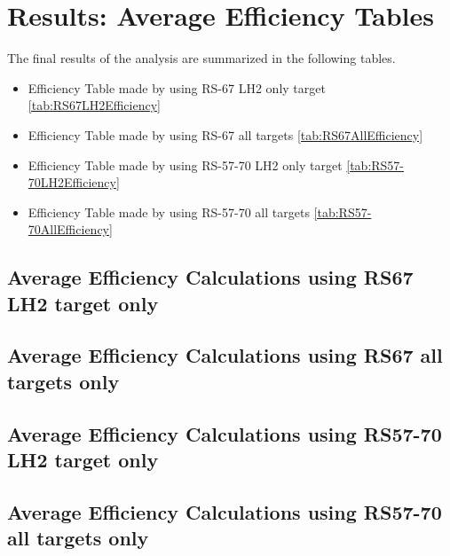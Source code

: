 \documentclass[11pt]{article}
\begin{document}
\section{Results: Average Efficiency Tables}
The final results of the analysis are summarized in the following tables. 
\begin{itemize}
 \item Efficiency Table made by using RS-67 LH2 only target \ref{tab:RS67LH2Efficiency}
 \item Efficiency Table made by using RS-67 all targets \ref{tab:RS67AllEfficiency}
 \item Efficiency Table made by using RS-57-70 LH2 only target \ref{tab:RS57-70LH2Efficiency}
 \item Efficiency Table made by using RS-57-70 all targets \ref{tab:RS57-70AllEfficiency}
\end{itemize}

\clearpage
\subsection{Average Efficiency Calculations using RS67 LH2 target only}

\clearpage
\subsection{Average Efficiency Calculations using RS67 all targets only}

\clearpage
\subsection{Average Efficiency Calculations using RS57-70 LH2 target only}

\clearpage
\subsection{Average Efficiency Calculations using RS57-70 all targets only}

\end{document}

